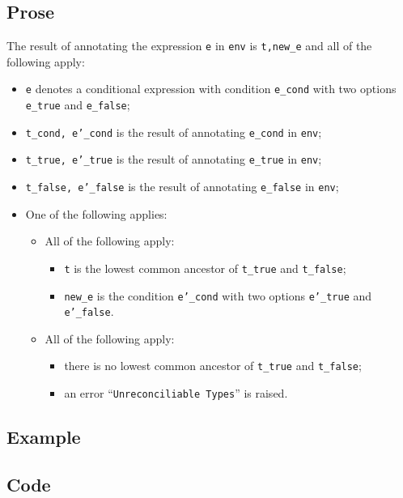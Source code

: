 \documentclass{book}
\begin{document}
  \subsection{Prose}
  The result of annotating the expression \texttt{e} in \texttt{env} is
\texttt{t,new\_e} and all of the following apply:
  \begin{itemize}
  \item \texttt{e} denotes a conditional expression with condition \texttt{e\_cond} with two options \texttt{e\_true} and \texttt{e\_false};
  \item \texttt{t\_cond, e'\_cond} is the result of annotating \texttt{e\_cond} in \texttt{env};
  \item \texttt{t\_true, e'\_true} is the result of annotating \texttt{e\_true} in \texttt{env};
  \item \texttt{t\_false, e'\_false} is the result of annotating \texttt{e\_false} in \texttt{env};
  \item One of the following applies:
    \begin{itemize}
    \item All of the following apply:
      \begin{itemize}
      \item \texttt{t} is the lowest common ancestor of \texttt{t\_true} and \texttt{t\_false};
      \item \texttt{new\_e} is the condition \texttt{e'\_cond} with two options \texttt{e'\_true} and \texttt{e'\_false}.
      \end{itemize}
    \item All of the following apply:
      \begin{itemize}
      \item there is no lowest common ancestor of \texttt{t\_true} and \texttt{t\_false};
      \item an error ``\texttt{Unreconciliable Types}'' is raised.
      \end{itemize}
    \end{itemize}
  \end{itemize}

  \subsection{Example}

  \subsection{Code}
\end{document}
